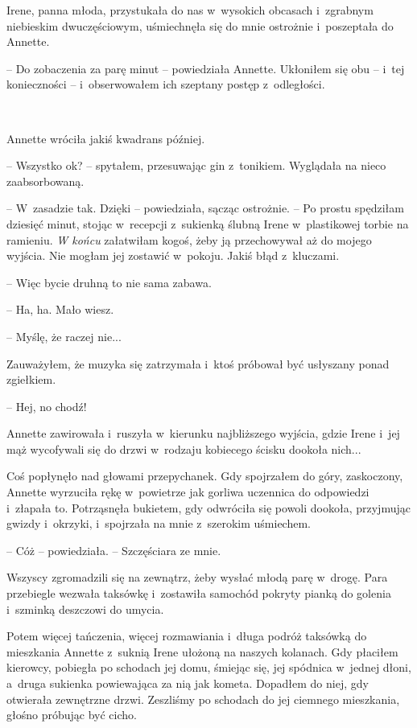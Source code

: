 \documentclass[oneside,polish,11pt,sfheadings]{mwbk}
\begin{document}
Irene, panna młoda, przystukała do nas w~wysokich obcasach i~zgrabnym
niebieskim dwuczęściowym, uśmiechnęła się do mnie ostrożnie i~poszeptała
do Annette.

-- Do zobaczenia za parę minut -- powiedziała Annette. Ukłoniłem się obu -- i~tej konieczności -- i~obserwowałem ich szeptany postęp z~odległości.

~

Annette wróciła jakiś kwadrans później.

-- Wszystko ok? -- spytałem, przesuwając gin z~tonikiem. Wyglądała na nieco
zaabsorbowaną.

-- W~zasadzie tak. Dzięki -- powiedziała, sącząc ostrożnie. -- Po prostu
spędziłam dziesięć minut, stojąc w~recepcji z~sukienką ślubną Irene w~plastikowej torbie na ramieniu. \emph{W końcu} załatwiłam kogoś, żeby ją
przechowywał aż do mojego wyjścia. Nie mogłam jej zostawić w~pokoju.
Jakiś błąd z~kluczami.

-- Więc bycie druhną to nie sama zabawa.

-- Ha, ha. Mało wiesz.

-- Myślę, że raczej nie...

Zauważyłem, że muzyka się zatrzymała i~ktoś próbował być usłyszany ponad
zgiełkiem.

-- Hej, no chodź!

Annette zawirowała i~ruszyła w~kierunku najbliższego wyjścia, gdzie
Irene i~jej mąż wycofywali się do drzwi w~rodzaju kobiecego ścisku
dookoła nich...

Coś popłynęło nad głowami przepychanek. Gdy spojrzałem do góry,
zaskoczony, Annette wyrzuciła rękę w~powietrze jak gorliwa uczennica do
odpowiedzi i~złapała to. Potrząsnęła bukietem, gdy odwróciła się powoli
dookoła, przyjmując gwizdy i~okrzyki, i~spojrzała na mnie z~szerokim
uśmiechem.

-- Cóż -- powiedziała. -- Szczęściara ze mnie.

Wszyscy zgromadzili się na zewnątrz, żeby wysłać młodą parę w~drogę.
Para przebiegle wezwała taksówkę i~zostawiła samochód pokryty pianką do
golenia i~szminką deszczowi do umycia.

Potem więcej tańczenia, więcej rozmawiania i~długa podróż taksówką do
mieszkania Annette z~suknią Irene ułożoną na naszych kolanach. Gdy
płaciłem kierowcy, pobiegła po schodach jej domu, śmiejąc się, jej
spódnica w~jednej dłoni, a~druga sukienka powiewająca za nią jak kometa.
Dopadłem do niej, gdy otwierała zewnętrzne drzwi. Zeszliśmy po schodach
do jej ciemnego mieszkania, głośno próbując być cicho.
\end{document}
